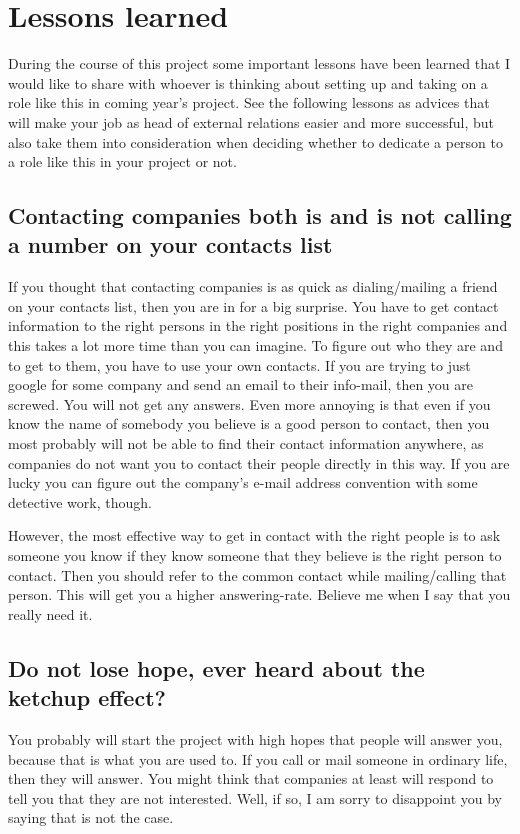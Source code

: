 \section{Lessons learned}\label{sec:lessons_learned}
During the course of this project some important lessons have been learned that I would like to share with whoever is thinking about setting up and taking on a role like this in coming year's project. See the following lessons as advices that will make your job as head of external relations easier and more successful, but also take them into consideration when deciding whether to dedicate a person to a role like this in your project or not.

\subsection{Contacting companies both is and is not calling a number on your contacts list}
If you thought that contacting companies is as quick as dialing/mailing a friend on your contacts list, then you are in for a big surprise. You have to get contact information to the right persons in the right positions in the right companies and this takes a lot more time than you can imagine. To figure out who they are and to get to them, you have to use your own contacts. If you are trying to just google for some company and send an email to their info-mail, then you are screwed. You will not get any answers. Even more annoying is that even if you know the name of somebody you believe is a good person to contact, then you most probably will not be able to find their contact information anywhere, as companies do not want you to contact their people directly in this way. If you are lucky you can figure out the company's e-mail address convention with some detective work, though. 

However, the most effective way to get in contact with the right people is to ask someone you know if they know someone that they believe is the right person to contact. Then you should refer to the common contact while mailing/calling that person. This will get you a higher answering-rate. Believe me when I say that you really need it.

\subsection{Do not lose hope, ever heard about the ketchup effect?}
You probably will start the project with high hopes that people will answer you, because that is what you are used to. If you call or mail someone in ordinary life, then they will answer. You might think that companies at least will respond to tell you that they are not interested. Well, if so, I am sorry to disappoint you by saying that is not the case.

